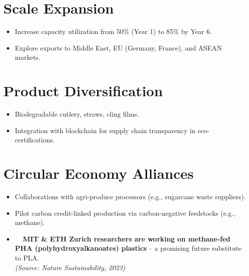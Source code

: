 \section{Scale Expansion}

\begin{itemize}
    \item Increase capacity utilization from 50\% (Year 1) to 85\% by Year 6.
    \item Explore exports to Middle East, EU (Germany, France), and ASEAN markets.
\end{itemize}

\section{Product Diversification}

\begin{itemize}
    \item Biodegradable cutlery, straws, cling films.
    \item Integration with blockchain for supply chain transparency in eco-certifications.
\end{itemize}

\section{Circular Economy Alliances}

\begin{itemize}
    \item Collaborations with agri-produce processors (e.g., sugarcane waste suppliers).
    \item Pilot carbon credit-linked production via carbon-negative feedstocks (e.g., methane).
    \item \textbf{\faFlask\ \ MIT \& ETH Zurich researchers are working on methane-fed PHA (polyhydroxyalkanoates) plastics} – a promising future substitute to PLA. \\
    \textit{(Source: Nature Sustainability, 2023)}
\end{itemize}